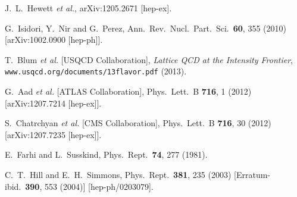 \begin{thebibliography}{99}



  J.~L.~Hewett {\it et al.},
  arXiv:1205.2671 [hep-ex].
  
  G.~Isidori, Y.~Nir and G.~Perez,
  Ann.\ Rev.\ Nucl.\ Part.\ Sci.\  {\bf 60}, 355 (2010)
  [arXiv:1002.0900 [hep-ph]].
  
T.~Blum {\em et al.} [USQCD Collaboration],
{\em Lattice QCD at the Intensity Frontier},
{\tt www.usqcd.org/documents/13flavor.pdf} (2013).
  
  G.~Aad {\it et al.}  [ATLAS Collaboration],
  Phys.\ Lett.\ B {\bf 716}, 1 (2012)
  [arXiv:1207.7214 [hep-ex]].
  
  S.~Chatrchyan {\it et al.}  [CMS Collaboration],
  Phys.\ Lett.\ B {\bf 716}, 30 (2012)
  [arXiv:1207.7235 [hep-ex]].
  
  E.~Farhi and L.~Susskind,
  Phys.\ Rept.\  {\bf 74}, 277 (1981).
  
  C.~T.~Hill and E.~H.~Simmons,
  Phys.\ Rept.\  {\bf 381}, 235 (2003)
  [Erratum-ibid.\  {\bf 390}, 553 (2004)]
  [hep-ph/0203079].
  

\end{thebibliography}
